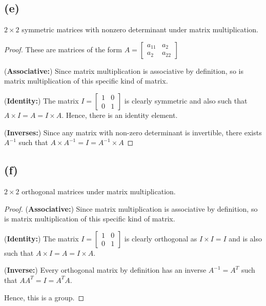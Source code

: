 \documentclass{article}
\begin{document}
\subsection*{(e)}
$2\times 2$ symmetric matrices with nonzero determinant under matrix multiplication.

\begin{proof}
    These are matrices of the form $A = \begin{bmatrix}
            a_{11} & a_{2}  \\
            a_2    & a_{22}
        \end{bmatrix}$

    (\textbf{Associative:}) Since matrix multiplication is associative by definition, so is
    matrix multiplication of this specific kind of matrix.

    (\textbf{Identity:}) The matrix $I = \begin{bmatrix}
            1 & 0 \\
            0 & 1
        \end{bmatrix}$ is clearly symmetric and also such that $A\times I = A = I \times A$.
    Hence, there is an identity element.

    (\textbf{Inverses:}) Since any matrix with non-zero determinant is invertible, there exists
    $A^{-1}$ such that $A\times A^{-1} = I = A^{-1}\times A$
\end{proof}

\subsection*{(f)}
$2 \times 2$ orthogonal matrices under matrix multiplication.

\begin{proof}
    (\textbf{Associative:}) Since matrix multiplication is associative by definition, so is
    matrix multiplication of this specific kind of matrix.

    (\textbf{Identity:}) The matrix $I = \begin{bmatrix}
            1 & 0 \\
            0 & 1
        \end{bmatrix}$ is clearly orthogonal as $I \times I = I$
    and is also such that $A\times I = A = I \times A$.

    (\textbf{Inverse:}) Every orthogonal matrix by definition has an inverse
    $A^{-1} = A^T$ such that $AA^T = I = A^T A$.

    Hence, this is a group.
\end{proof}
\end{document}
